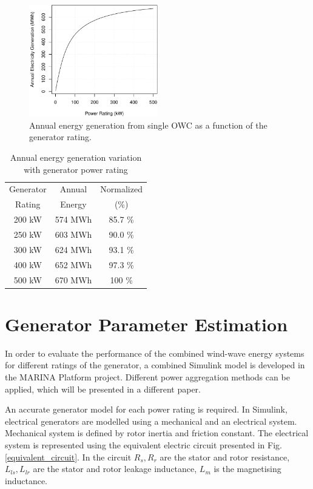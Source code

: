 \documentclass[twocolumn]{article}
\begin{document}
  \begin{figure}[]
    \centering
    \includegraphics[width=0.5\textwidth]{generator_rating}
    \caption{Annual energy generation from single OWC as a function of the generator rating.} 
    \label{generator_rating}
  \end{figure}
  
  \begin{table}[t]
    \centering
    \begin{tabular}{ccc}
     Generator & Annual & Normalized \\
     Rating & Energy & (\%) \\
    \hline
  200 kW & 574 MWh & 85.7 \% \\
  250 kW & 603 MWh & 90.0 \% \\
  300 kW & 624 MWh & 93.1 \% \\
  400 kW & 652 MWh & 97.3 \% \\
  500 kW & 670 MWh & 100 \%\\
  \hline
    \end{tabular}
    \caption{Annual energy generation variation with generator power rating}
    \label{generator_rating_table}
  \end{table}
  

\section{Generator Parameter Estimation}

In order to evaluate the performance of the combined wind-wave energy systems for different ratings of the generator, a combined Simulink model is developed in the MARINA Platform project. Different power aggregation methods can be applied, which will be presented in a different paper.

An accurate generator model for each power rating is required. In Simulink, electrical generators are modelled using a mechanical and an electrical system. Mechanical system is defined by rotor inertia and friction constant. The electrical system is represented using the equivalent electric circuit presented in Fig. \ref{equivalent_circuit}. In the circuit $R_s, R_r$ are the stator and rotor resistance, $L_{ls}, L_{lr}$ are the stator and rotor leakage inductance, $L_m$ is the magnetising inductance.
\end{document}
